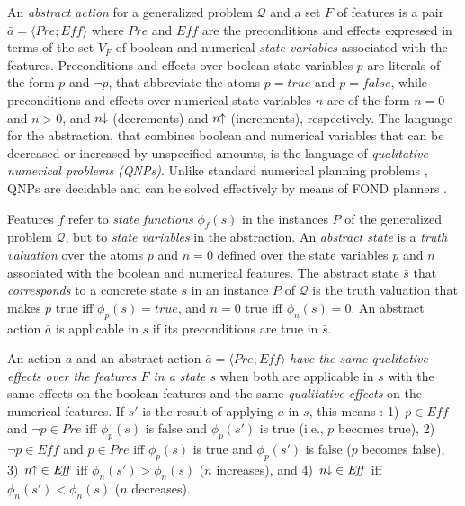 \documentclass[letterpaper]{article} %
\newcommand{\tup}[1]{\langle #1 \rangle}
\newcommand{\Q}{\mathcal{Q}}
\newcommand{\Eff}{{\mathit{Eff}}}
\newcommand{\abst}[2]{\tup{#1;#2}}
\newcommand{\pplus}{\hspace{-.05em}\raisebox{.15ex}{\footnotesize$\uparrow$}}
\newcommand{\mminus}{\hspace{-.05em}\raisebox{.15ex}{\footnotesize$\downarrow$}}
\begin{document}
An \emph{abstract action}  for a generalized problem $\Q$ and a set $F$ of features
is a pair $\bar{a}=\abst{Pre}{\Eff}$ where $Pre$ and $\Eff$ are the  preconditions
and effects expressed in terms of the  set $V_F$ of boolean and numerical \emph{state variables}
associated with the features. Preconditions and effects over boolean state variables $p$ are literals of the form $p$
and $\neg p$, that abbreviate the  atoms $p=true$ and $p=false$, while
preconditions and effects over  numerical state variables $n$ are of  the form $n=0$ and $n > 0$,
and   $n\mminus$ (decrements) and  $n\pplus$ (increments), respectively.
The language for the abstraction,  that combines boolean and numerical variables
that can be decreased or increased by unspecified amounts, is the language of \emph{qualitative numerical problems (QNPs)}.
Unlike standard numerical planning problems \cite{helmert:numerical}, QNPs
are decidable and can be solved effectively by means of  FOND planners \cite{srivastava:aaai2011,bonet:ijcai2017}.


Features $f$ refer to \emph{state functions} $\phi_f(s)$ in the instances $P$
of the generalized problem $\Q$, but  to \emph{state variables} in  the abstraction.
An \emph{abstract state} is  a \emph{truth valuation} over
the atoms $p$ and $n=0$ defined over the state variables $p$ and $n$
associated with the boolean and  numerical features.
The abstract state $\bar{s}$ that \emph{corresponds} to a concrete state $s$
in an instance $P$ of $\Q$ is the truth valuation that makes $p$ true iff $\phi_p(s)=true$,
and $n=0$ true iff $\phi_n(s) = 0$. An abstract action $\bar{a}$ is applicable in  $s$
if its preconditions are true in $\bar{s}$.

An action $a$ and an abstract action $\bar{a}=\abst{Pre}{\Eff}$  \emph{have  the same qualitative effects over the features $F$
in a state $s$} when both are applicable in $s$ with the same effects on the boolean features and
the same \emph{qualitative effects} on the numerical features. If $s'$ is the result of applying $a$ in $s$,
this means \cite{bonet:ijcai2018}:
1)~$p \in \Eff$ and $\neg p \in Pre$ iff
$\phi_p(s)$ is false and $\phi_p(s')$ is true (i.e., $p$ becomes true),
%
2)~$\neg p \in \Eff$ and $p \in Pre$ iff
$\phi_p(s)$ is true and $\phi_p(s')$ is false ($p$ becomes false),
%
3)~$n\pplus \in \Eff$ iff $\phi_n(s') > \phi_n(s)$ ($n$ increases),
and 
%
4)~$n\mminus \in \Eff$ iff $\phi_n(s') < \phi_n(s)$ ($n$ decreases).
\end{document}
